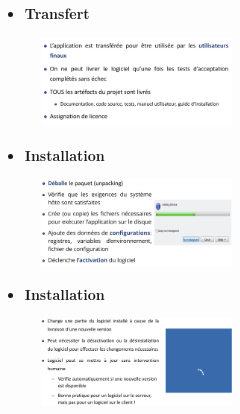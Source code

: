 \documentclass[16pt]{report}
\begin{document}
\begin{multicols*}{2}
    \begin{itemize}
        \item \textbf{Transfert}  
    \end{itemize}


    \begin{figure}[H]
        \begin{center}
            \includegraphics[width=0.45\textwidth]{Deploiement3.png}
        \end{center}
    \end{figure}
    

    \begin{itemize}
        \item \textbf{Installation}  
    \end{itemize}


    \begin{figure}[H]
        \begin{center}
            \includegraphics[width=0.45\textwidth]{Deploiement4.png}
        \end{center}
    \end{figure}
    

    \begin{itemize}
        \item \textbf{Installation}  
    \end{itemize}


    \begin{figure}[H]
        \begin{center}
            \includegraphics[width=0.45\textwidth]{Deploiement5.png}
        \end{center}
    \end{figure}



\end{multicols*}
\end{document}
